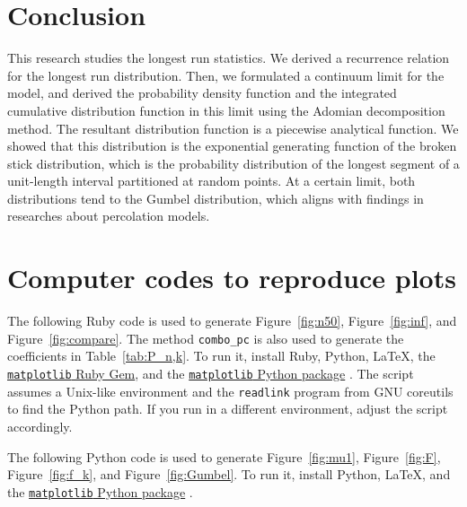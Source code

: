 \documentclass[oneside,12pt,final]{ucthesis-CA2012}
\newcommand{\ttt}[1]{\texttt{#1}}
\begin{document}
\begin{mainmatter}
\chapter{Conclusion}

This research studies the longest run statistics.
We derived a recurrence relation for the longest run distribution.
Then, we formulated a continuum limit for the model,
and derived the probability density function and the integrated cumulative distribution function
in this limit using the Adomian decomposition method.
The resultant distribution function is a piecewise analytical function.
We showed that this distribution is the exponential generating function
of the broken stick distribution,
which is the probability distribution of the longest segment
of a unit-length interval partitioned at random points.
At a certain limit, both distributions tend to the Gumbel distribution,
which aligns with findings in researches about percolation models.

\appendix
\dsp
\chapter{Computer codes to reproduce plots}

The following Ruby code is used to generate Figure~\ref{fig:n50},
Figure~\ref{fig:inf}, and Figure~\ref{fig:compare}.
The method \ttt{combo\_pc} is also used to generate the coefficients in Table~\ref{tab:P_n,k}.
To run it, install Ruby, Python, \LaTeX, the
\href{https://rubygems.org/gems/matplotlib}{\ttt{matplotlib} Ruby Gem},
and the
\href{https://pypi.org/project/matplotlib}{\ttt{matplotlib} Python package} \cite{Hunter:2007}.
The script assumes a Unix-like environment and the \ttt{readlink} program from GNU coreutils
to find the Python path.
If you run in a different environment, adjust the script accordingly.



The following Python code is used to generate Figure~\ref{fig:mu1},
Figure~\ref{fig:F}, Figure~\ref{fig:f_k}, and Figure~\ref{fig:Gumbel}.
To run it, install Python, \LaTeX, and the
\href{https://pypi.org/project/matplotlib}{\ttt{matplotlib} Python package} \cite{Hunter:2007}.



\end{mainmatter}
\ssp


\end{document}
